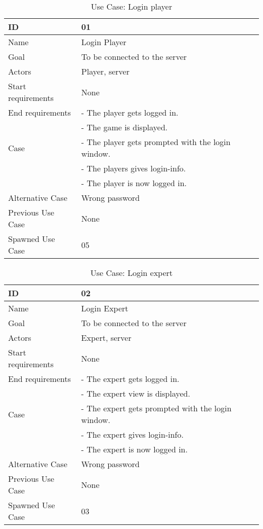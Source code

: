\begin{table}[H]
\begin{tabular}{|l|l|} \hline
	\textbf{ID} & \textbf{01}\\ \hline
	Name & Login Player\\ \hline
	Goal & To be connected to the server\\ \hline
	Actors & Player, server\\ \hline
	Start requirements & None\\ \hline
	End requirements & - The player gets logged in.\\
					 & - The game is displayed.\\ \hline
	Case & - The player gets prompted with the login window. \\
		 	& - The players gives login-info.\\
			& - The player is now logged in.\\ \hline
	Alternative Case & Wrong password\\ \hline
	Previous Use Case & None\\ \hline
	Spawned Use Case & 05\\ \hline
\end{tabular}
\caption{Use Case: Login player}
\label{fig:usecase01table}
\end{table}


\begin{table}[H]
\begin{tabular}{|l|l|} \hline
	\textbf{ID} & \textbf{02}\\ \hline
	Name & Login Expert\\ \hline
	Goal & To be connected to the server\\ \hline
	Actors & Expert, server\\ \hline
	Start requirements & None\\ \hline
	End requirements & - The expert gets logged in.\\
					 & - The expert view is displayed.\\ \hline
	Case & - The expert gets prompted with the login window. \\
		 	& - The expert gives login-info.\\
			& - The expert is now logged in.\\ \hline
	Alternative Case & Wrong password\\ \hline
	Previous Use Case & None\\ \hline
	Spawned Use Case & 03\\ \hline
\end{tabular}
\caption{Use Case: Login expert}
\label{fig:usecase02table}
\end{table}

